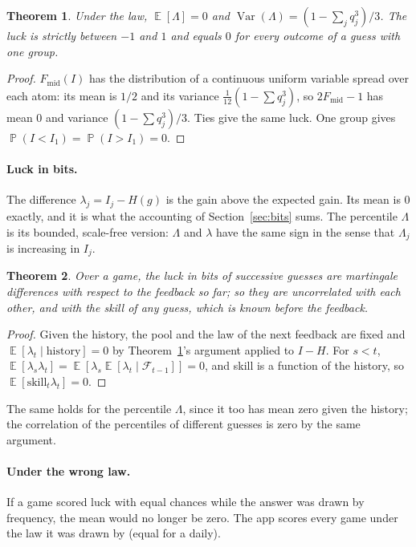 \documentclass[11pt]{article}
\newtheorem{theorem}{Theorem}
\theoremstyle{definition}
\theoremstyle{remark}
\DeclareMathOperator{\E}{\mathbb{E}}
\DeclareMathOperator{\Prob}{\mathbb{P}}
\DeclareMathOperator{\Var}{Var}
\newcommand{\Gain}{I}
\newcommand{\Luck}{\Lambda}
\begin{document}
\begin{theorem}\label{thm:luck}
Under the law, $\E[\Luck]=0$ and $\Var(\Luck)=(1-\sum_j q_j^3)/3$. The luck is
strictly between $-1$ and $1$ and equals $0$ for every outcome of a guess with one
group.
\end{theorem}
\begin{proof}
$F_{\mathrm{mid}}(\Gain)$ has the distribution of a continuous uniform variable
spread over each atom: its mean is $1/2$ and its variance $\tfrac1{12}(1-\sum q_j^3)$,
so $2F_{\mathrm{mid}}-1$ has mean $0$ and variance $(1-\sum q_j^3)/3$. Ties give the
same luck. One group gives $\Prob(\Gain<\Gain_1)=\Prob(\Gain>\Gain_1)=0$.
\end{proof}

\paragraph{Luck in bits.} The difference $\lambda_j=\Gain_j-H(g)$ is the gain above
the expected gain. Its mean is $0$ exactly, and it is what the accounting of
Section~\ref{sec:bits} sums. The percentile $\Luck$ is its bounded, scale-free
version: $\Luck$ and $\lambda$ have the same sign in the sense that $\Luck_j$ is
increasing in $\Gain_j$.

\begin{theorem}\label{thm:uncorr}
Over a game, the luck in bits of successive guesses are martingale differences with
respect to the feedback so far; so they are uncorrelated with each other, and with the
skill of any guess, which is known before the feedback.
\end{theorem}
\begin{proof}
Given the history, the pool and the law of the next feedback are fixed and
$\E[\lambda_t\mid\text{history}]=0$ by Theorem~\ref{thm:luck}'s argument applied to
$\Gain-H$. For $s<t$, $\E[\lambda_s\lambda_t]=\E[\lambda_s\E[\lambda_t\mid\mathcal F_{t-1}]]=0$,
and skill is a function of the history, so $\E[\mathrm{skill}_t\lambda_t]=0$.
\end{proof}

The same holds for the percentile $\Luck$, since it too has mean zero given the
history; the correlation of the percentiles of different guesses is zero by the same
argument.

\paragraph{Under the wrong law.} If a game scored luck with equal chances while the
answer was drawn by frequency, the mean would no longer be zero. The app scores every
game under the law it was drawn by (equal for a daily).
\end{document}
